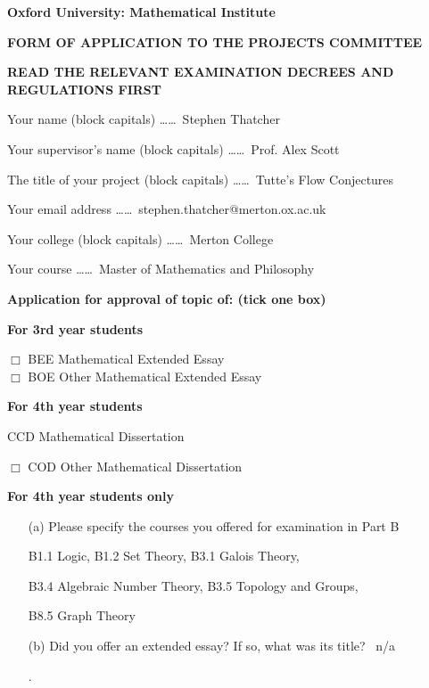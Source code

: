 \documentclass[11pt]{article}
\newcommand{\checkbox}{\makebox[0pt][l]{$\square$}\raisebox{.15ex}{\hspace{0.1em}$\checkmark$}}
\begin{document}
\begin{center}
\textbf{Oxford University: Mathematical Institute}

\textbf{FORM OF APPLICATION TO THE PROJECTS COMMITTEE}

\textbf{READ THE RELEVANT EXAMINATION DECREES AND REGULATIONS FIRST}



\end{center}
\bigskip

\bigskip

Your name (block capitals) \dots\dots\ {\sc Stephen Thatcher} \dotfill

Your supervisor's name (block capitals) \dots\dots\ {\sc Prof. Alex Scott} \dotfill

The title of your project (block capitals) \dots\dots\ {\sc Tutte's Flow Conjectures} \dotfill

Your email address \dots\dots\ {\sc stephen.thatcher@merton.ox.ac.uk } \dotfill

Your college (block capitals) \dots\dots\ {\sc Merton College} \dotfill

Your course \dots\dots\ {\sc Master of Mathematics and Philosophy} \dotfill


\medskip



\textbf{Application for approval of topic of: (tick one box)}


\bigskip

\textbf{For 3rd year students}


{\huge $\Box$} BEE Mathematical Extended Essay\\
{\huge $\Box$} BOE Other Mathematical Extended Essay

\bigskip

\textbf{For 4th year students}

{\huge \checkbox} CCD Mathematical Dissertation 



{\huge $\Box$} COD Other Mathematical Dissertation 

 



\textbf{For 4th year students only}

\begin{enumerate}
\item[(a)] Please specify the courses you offered for examination in Part B 

{\sc B1.1 Logic, B1.2 Set Theory, B3.1 Galois Theory,} \dotfill

{\sc B3.4 Algebraic Number Theory, B3.5 Topology and Groups,} \dotfill

{\sc B8.5 Graph Theory} \dotfill

\item[(b)] Did you offer an extended essay?  If so, what was its title? \dotfill\ {\sc n/a} \dotfill

.\dotfill

\end{enumerate}
\end{document}
